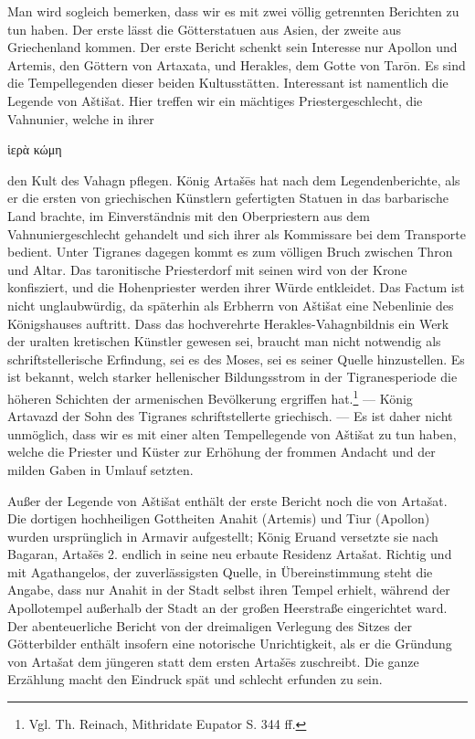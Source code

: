 \documentclass{article}
\begin{document}
Man wird sogleich bemerken, dass wir es mit zwei völlig getrennten Berichten zu tun haben. Der erste lässt die Götterstatuen aus Asien, der zweite aus Griechenland kommen. Der erste Bericht schenkt sein Interesse nur Apollon und Artemis, den Göttern von Artaxata, und Herakles, dem Gotte von Tarōn. Es sind die Tempellegenden dieser beiden Kultusstätten. Interessant ist namentlich die Legende von Aštišat. Hier treffen wir ein mächtiges Priestergeschlecht, die Vahnunier, welche in ihrer \begin{greek}ἱερὰ κώμη\end{greek} den Kult des Vahagn pflegen. König Artašēs hat nach dem Legendenberichte, als er die ersten von griechischen Künstlern gefertigten Statuen in das barbarische Land brachte, im Einverständnis mit den Oberpriestern aus dem Vahnuniergeschlecht gehandelt und sich ihrer als Kommissare bei dem Transporte bedient. Unter Tigranes dagegen kommt es zum völligen Bruch zwischen Thron und Altar. Das taronitische Priesterdorf mit seinen wird von der Krone konfisziert, und die Hohenpriester werden ihrer Würde entkleidet. Das Factum ist nicht unglaubwürdig, da späterhin als Erbherrn von Aštišat eine Nebenlinie des Königshauses auftritt. Dass das hochverehrte Herakles-Vahagnbildnis ein Werk der uralten kretischen Künstler gewesen sei, braucht man nicht notwendig als schriftstellerische Erfindung, sei es des Moses, sei es seiner Quelle hinzustellen. Es ist bekannt, welch starker hellenischer Bildungsstrom in der Tigranesperiode die höheren Schichten der armenischen Bevölkerung ergriffen hat.\footnote{Vgl. Th. Reinach, Mithridate Eupator S. 344 ff.} — König Artavazd der Sohn des Tigranes schriftstellerte griechisch. — Es ist daher nicht unmöglich, dass wir es mit einer alten Tempellegende von Aštišat zu tun haben, welche die Priester und Küster zur Erhöhung der frommen Andacht und der milden Gaben in Umlauf setzten.

Außer der Legende von Aštišat enthält der erste Bericht noch die von Artašat. Die dortigen hochheiligen Gottheiten Anahit (Artemis) und Tiur (Apollon) wurden ursprünglich in Armavir aufgestellt; König Eruand versetzte sie nach Bagaran, Artašēs 2. endlich in seine neu erbaute Residenz Artašat. Richtig und mit Agathangelos, der zuverlässigsten Quelle, in Übereinstimmung steht die Angabe, dass nur Anahit in der Stadt selbst ihren Tempel erhielt, während der Apollotempel außerhalb der Stadt an der großen Heerstraße eingerichtet ward. Der abenteuerliche Bericht von der dreimaligen Verlegung des Sitzes der Götterbilder enthält insofern eine notorische Unrichtigkeit, als er die Gründung von Artašat dem jüngeren statt dem ersten Artašēs zuschreibt. Die ganze Erzählung macht den Eindruck spät und schlecht erfunden zu sein.
\end{document}
